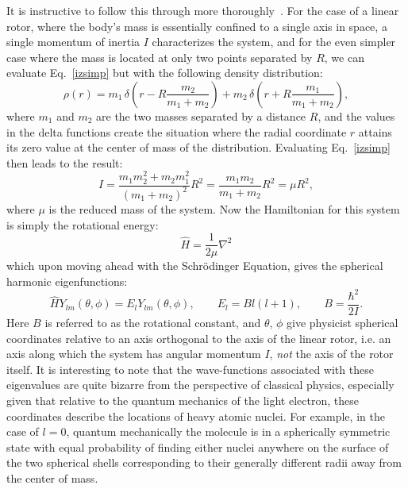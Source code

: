 It is instructive to follow this through more thoroughly~\citep[Sec.~2.8]{Brown2003}.
For the case of a linear rotor, where the body's mass is essentially confined to a single axis in space, a single momentum of inertia $I$ characterizes the system, and for the even simpler case where the mass is located at only two points separated by $R$, we can evaluate Eq.~\ref{izsimp} but with the following density distribution:
\begin{equation}
\rho(r)=m_1\,\delta\!\left(r-R\frac{m_2}{m_1+m_2}\right)+m_2\,\delta\!\left(r+R\frac{m_1}{m_1+m_2}\right),
\end{equation}
where $m_1$ and $m_2$ are the two masses separated by a distance $R$, and the values in the delta functions create the situation where the radial coordinate $r$ attains its zero value at the center of mass of the distribution.
Evaluating Eq.~\ref{izsimp} then leads to the result:
\begin{equation}
I = \frac{m_1m_2^2+m_2m_1^2}{(m_1+m_2)^2}R^2 = \frac{m_1m_2}{m_1+m_2}R^2 = \mu R^2,\label{eqdefI}
\end{equation}
where $\mu$ is the reduced mass of the system.
Now the Hamiltonian for this system is simply the rotational energy:
\begin{equation}
\hat{H} = \frac{1}{2\mu}\nabla^2
\end{equation}
which upon moving ahead with the Schr\"{o}dinger Equation, gives the spherical harmonic eigenfunctions:
\begin{equation}
\hat{H}Y_{lm}(\theta,\phi) = E_lY_{lm}(\theta,\phi),\qquad E_l = Bl(l+1),\qquad B=\frac{\hbar^2}{2I}.\label{eqdefb}
\end{equation}
Here $B$ is referred to as the rotational constant, and $\theta$, $\phi$ give physicist spherical coordinates relative to an axis orthogonal to the axis of the linear rotor, i.e. an axis along which the system has angular momentum $I$, \emph{not} the axis of the rotor itself.
It is interesting to note that the wave-functions associated with these eigenvalues are quite bizarre from the perspective of classical physics, especially given that relative to the quantum mechanics of the light electron, these coordinates describe the locations of heavy atomic nuclei.
For example, in the case of $l=0$, quantum mechanically the molecule is in a spherically symmetric state with equal probability of finding either nuclei anywhere on the surface of the two spherical shells corresponding to their generally different radii away from the center of mass.

